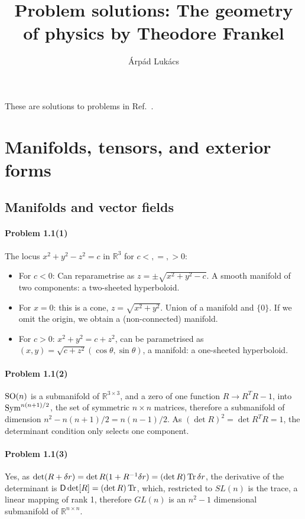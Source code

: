 \documentclass[a4paper,12pt]{article}
\title{Problem solutions: The geometry of physics by Theodore Frankel}
\author{Árpád Lukács}
\def\op#1{{\sf #1}}
\def\Tr{\ensuremath{\mathop{\rm Tr}}}
\newcommand{\problem}[1]{\paragraph{Problem #1}}
\begin{document}

\maketitle

These are solutions to problems in Ref.\ \cite{Frankel}.


\section{Manifolds, tensors, and exterior forms}

\subsection{Manifolds and vector fields}


\problem{1.1(1)} The locus $x^2 + y^2 - z^2 = c$ in $\mathbb{R}^3$ for $c <,=,> 0$:
\begin{itemize}
\item For $c<0$: Can reparametrise as $z = \pm \sqrt{x^2 + y^2 - c}$. A smooth manifold of two components: a two-sheeted hyperboloid.
\item For $x=0$: this is a cone, $z=\sqrt{x^2+y^2}$. Union of a manifold and $\{0\}$. If we omit the origin, we obtain a (non-connected) manifold. 
\item For $c>0$: $x^2 + y^2 = c + z^2$, can be parametrised as $(x,y) = \sqrt{c+z^2}(\cos\theta, \sin{\theta})$, a manifold: a one-sheeted hyperboloid.
\end{itemize}


\problem{1.1(2)} ${\rm SO}(n)$ is a submanifold of $\mathbb{R}^{3\times 3}$, and a zero of one function $R\to R^T R -1$, into ${\rm Sym}^{n(n+1)/2}$, the set of symmetric $n\times n$ matrices, therefore a submanifold of dimension $n^2 - n(n+1)/2 = n(n-1)/2$.
As $(\det R)^2 = \det R^T R = 1$, the determinant condition only selects one component.


\problem{1.1(3)} Yes, as $\det (R+\delta r) = \det R (1 + R^{-1}\delta r) = (\det R)\Tr \delta r$, the derivative of the determinant is $\op{D}\det [R] = (\det R)\Tr$, which, restricted to $SL(n)$ is the trace, a linear mapping of rank 1, therefore $GL(n)$ is an $n^2-1$ dimensional submanifold of $\mathbb{R}^{n\times n}$.
\end{document}
